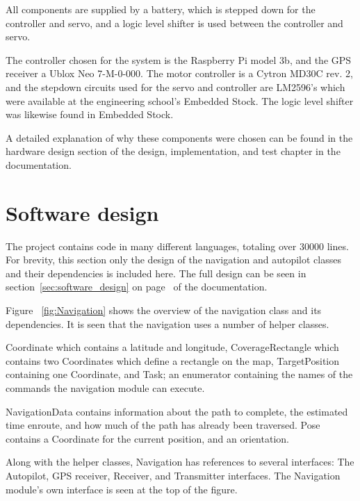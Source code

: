 All components are supplied by a battery, which is stepped down for the controller and servo, and a logic level shifter is used between the controller and servo.

The controller chosen for the system is the Raspberry Pi model 3b, and the GPS receiver a Ublox Neo 7-M-0-000. The motor controller is a Cytron MD30C rev. 2, and the stepdown circuits used for the servo and controller are LM2596's which were available at the engineering school's Embedded Stock. The logic level shifter was likewise found in Embedded Stock.

A detailed explanation of why these components were chosen can be found in the hardware design section of the design, implementation, and test chapter in the documentation.

\section{Software design}
The project contains code in many different languages, totaling over 30000 lines. For brevity, this section only the design of the navigation and autopilot classes and their dependencies is included here. The full design can be seen in section~\ref{sec:software_design} on page~\pageref{sec:software_design} of the documentation.

Figure ~\ref{fig:Navigation} shows the overview of the navigation class and its dependencies. It is seen that the navigation uses a number of helper classes.

Coordinate which contains a latitude and longitude, CoverageRectangle which contains two Coordinates which define a rectangle on the map, TargetPosition containing one Coordinate, and Task; an enumerator containing the names of the commands the navigation module can execute.

NavigationData contains information about the path to complete, the estimated time enroute, and how much of the path has already been traversed. Pose contains a Coordinate for the current position, and an orientation. 

Along with the helper classes, Navigation has references to several interfaces: The Autopilot, GPS receiver, Receiver, and Transmitter interfaces. The Navigation module's own interface is seen at the top of the figure.

